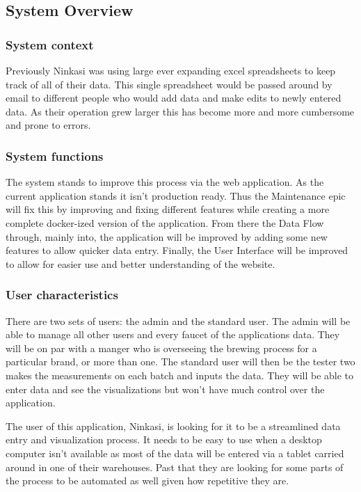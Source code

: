 \documentclass[draftclsnofoot,onecolumn,journal,letterpaper,compsoc,10pt]{IEEEtran}
\begin{document}
    \subsection{System Overview}
    
        \subsubsection{System context}
        Previously Ninkasi was using large ever expanding excel spreadsheets to keep track of all of their data.  This single spreadsheet would be passed around by email to different people who would add data and make edits to newly entered data.  As their operation grew larger this has become more and more cumbersome and prone to errors.
    
        \subsubsection{System functions}
        The system stands to improve this process via the web application.  As the current application stands it isn't production ready.  Thus the Maintenance epic will fix this by improving and fixing different features while creating a more complete docker-ized version of the application.  From there the Data Flow through, mainly into, the application will be improved by adding some new features to allow quicker data entry.  Finally, the User Interface will be improved to allow for easier use and better understanding of the website.
        
        \subsubsection{User characteristics}
        There are two sets of users: the admin and the standard user.  The admin will be able to manage all other users and every faucet of the applications data.  They will be on par with a manger who is overseeing the brewing process for a particular brand, or more than one.  The standard user will then be the tester two makes the measurements on each batch and inputs the data.  They will be able to enter data and see the visualizations but won't have much control over the application.
        
        The user of this application, Ninkasi, is looking for it to be a streamlined data entry and visualization process.  It needs to be easy to use when a desktop computer isn't available as most of the data will be entered via a tablet carried around in one of their warehouses.  Past that they are looking for some parts of the process to be automated as well given how repetitive they are.
\end{document}

